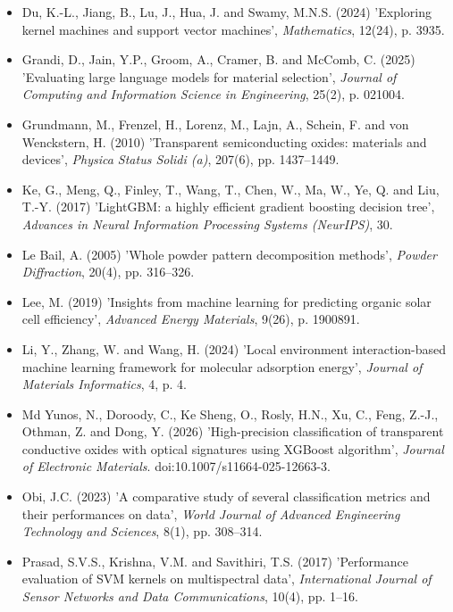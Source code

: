 \documentclass[12pt, oneside]{article} %
\begin{document}
\begin{itemize}[leftmargin=1.5em, label={}, itemsep=2mm]
\item Du, K.-L., Jiang, B., Lu, J., Hua, J. and Swamy, M.N.S. (2024) 'Exploring kernel machines and support vector machines', \textit{Mathematics}, 12(24), p. 3935.

\item Grandi, D., Jain, Y.P., Groom, A., Cramer, B. and McComb, C. (2025) 'Evaluating large language models for material selection', \textit{Journal of Computing and Information Science in Engineering}, 25(2), p. 021004.

\item Grundmann, M., Frenzel, H., Lorenz, M., Lajn, A., Schein, F. and von Wenckstern, H. (2010) 'Transparent semiconducting oxides: materials and devices', \textit{Physica Status Solidi (a)}, 207(6), pp. 1437--1449.

\item Ke, G., Meng, Q., Finley, T., Wang, T., Chen, W., Ma, W., Ye, Q. and Liu, T.-Y. (2017) 'LightGBM: a highly efficient gradient boosting decision tree', \textit{Advances in Neural Information Processing Systems (NeurIPS)}, 30.

\item Le Bail, A. (2005) 'Whole powder pattern decomposition methods', \textit{Powder Diffraction}, 20(4), pp. 316--326.

\item Lee, M. (2019) 'Insights from machine learning for predicting organic solar cell efficiency', \textit{Advanced Energy Materials}, 9(26), p. 1900891.

\item Li, Y., Zhang, W. and Wang, H. (2024) 'Local environment interaction-based machine learning framework for molecular adsorption energy', \textit{Journal of Materials Informatics}, 4, p. 4.

\item Md Yunos, N., Doroody, C., Ke Sheng, O., Rosly, H.N., Xu, C., Feng, Z.-J., Othman, Z. and Dong, Y. (2026) 'High-precision classification of transparent conductive oxides with optical signatures using XGBoost algorithm', \textit{Journal of Electronic Materials}. doi:10.1007/s11664-025-12663-3.

\item Obi, J.C. (2023) 'A comparative study of several classification metrics and their performances on data', \textit{World Journal of Advanced Engineering Technology and Sciences}, 8(1), pp. 308--314.

\item Prasad, S.V.S., Krishna, V.M. and Savithiri, T.S. (2017) 'Performance evaluation of SVM kernels on multispectral data', \textit{International Journal of Sensor Networks and Data Communications}, 10(4), pp. 1--16.


\end{itemize}
\end{document}

